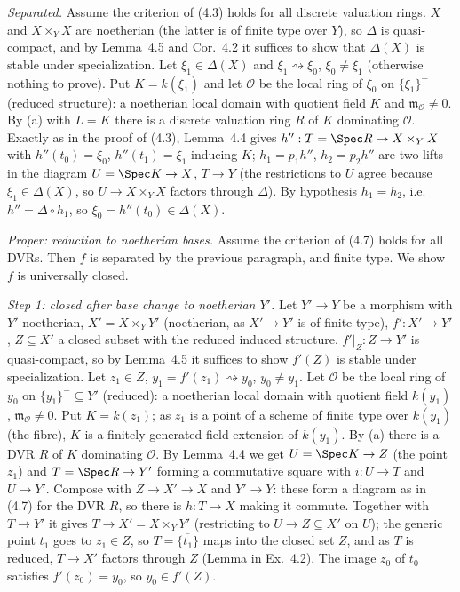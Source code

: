 \documentclass[11pt]{article}
\begin{document}
\emph{Separated.} Assume the criterion of (4.3) holds for all discrete valuation rings. $X$ and $X\times_YX$ are noetherian (the latter is of finite type over $Y$), so $\Delta$ is quasi-compact, and by Lemma~4.5 and Cor.~4.2 it suffices to show that $\Delta(X)$ is stable under specialization. Let $\xi_1\in\Delta(X)$ and $\xi_1\rightsquigarrow\xi_0$, $\xi_0\neq\xi_1$ (otherwise nothing to prove). Put $K=k(\xi_1)$ and let $\mathcal O$ be the local ring of $\xi_0$ on $\{\xi_1\}^-$ (reduced structure): a noetherian local domain with quotient field $K$ and $\mathfrak m_{\mathcal O}\neq0$. By (a) with $L=K$ there is a discrete valuation ring $R$ of $K$ dominating $\mathcal O$. Exactly as in the proof of (4.3), Lemma~4.4 gives $h'':T=\Spec R\to X\times_YX$ with $h''(t_0)=\xi_0$, $h''(t_1)=\xi_1$ inducing $K$; $h_1=p_1h''$, $h_2=p_2h''$ are two lifts in the diagram $U=\Spec K\to X$, $T\to Y$ (the restrictions to $U$ agree because $\xi_1\in\Delta(X)$, so $U\to X\times_YX$ factors through $\Delta$). By hypothesis $h_1=h_2$, i.e.\ $h''=\Delta\circ h_1$, so $\xi_0=h''(t_0)\in\Delta(X)$.

\emph{Proper: reduction to noetherian bases.} Assume the criterion of (4.7) holds for all DVRs. Then $f$ is separated by the previous paragraph, and finite type. We show $f$ is universally closed.

\emph{Step 1: closed after base change to noetherian $Y'$.} Let $Y'\to Y$ be a morphism with $Y'$ noetherian, $X'=X\times_YY'$ (noetherian, as $X'\to Y'$ is of finite type), $f':X'\to Y'$, $Z\subseteq X'$ a closed subset with the reduced induced structure. $f'|_Z:Z\to Y'$ is quasi-compact, so by Lemma~4.5 it suffices to show $f'(Z)$ is stable under specialization. Let $z_1\in Z$, $y_1=f'(z_1)\rightsquigarrow y_0$, $y_0\ne y_1$. Let $\mathcal O$ be the local ring of $y_0$ on $\{y_1\}^-\subseteq Y'$ (reduced): a noetherian local domain with quotient field $k(y_1)$, $\mathfrak m_{\mathcal O}\neq0$. Put $K=k(z_1)$; as $z_1$ is a point of a scheme of finite type over $k(y_1)$ (the fibre), $K$ is a finitely generated field extension of $k(y_1)$. By (a) there is a DVR $R$ of $K$ dominating $\mathcal O$. By Lemma~4.4 we get $U=\Spec K\to Z$ (the point $z_1$) and $T=\Spec R\to Y'$ forming a commutative square with $i:U\to T$ and $U\to Y'$. Compose with $Z\to X'\to X$ and $Y'\to Y$: these form a diagram as in (4.7) for the DVR $R$, so there is $h:T\to X$ making it commute. Together with $T\to Y'$ it gives $T\to X'=X\times_YY'$ (restricting to $U\to Z\subseteq X'$ on $U$); the generic point $t_1$ goes to $z_1\in Z$, so $T=\overline{\{t_1\}}$ maps into the closed set $Z$, and as $T$ is reduced, $T\to X'$ factors through $Z$ (Lemma in Ex.~4.2). The image $z_0$ of $t_0$ satisfies $f'(z_0)=y_0$, so $y_0\in f'(Z)$.
\end{document}
